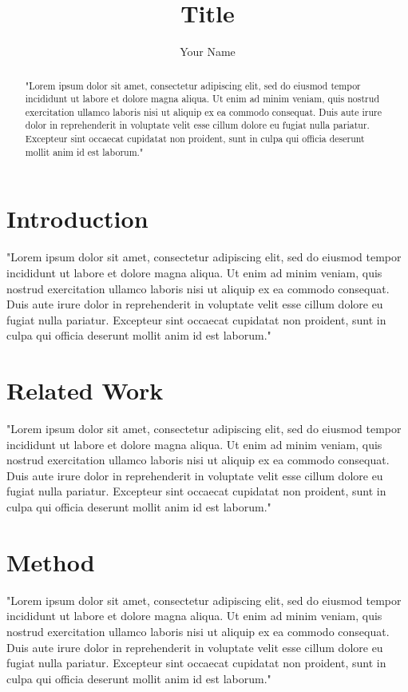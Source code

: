 \documentclass{article}
\title{Title}
\author{
  Your Name
}
\begin{document}
\maketitle


\begin{abstract}
"Lorem ipsum dolor sit amet, consectetur adipiscing elit, sed do eiusmod tempor incididunt ut labore et dolore magna aliqua. Ut enim ad minim veniam, quis nostrud exercitation ullamco laboris nisi ut aliquip ex ea commodo consequat. Duis aute irure dolor in reprehenderit in voluptate velit esse cillum dolore eu fugiat nulla pariatur. Excepteur sint occaecat cupidatat non proident, sunt in culpa qui officia deserunt mollit anim id est laborum."
\end{abstract}


\section{Introduction}
"Lorem ipsum dolor sit amet, consectetur adipiscing elit, sed do eiusmod tempor incididunt ut labore et dolore magna aliqua. Ut enim ad minim veniam, quis nostrud exercitation ullamco laboris nisi ut aliquip ex ea commodo consequat. Duis aute irure dolor in reprehenderit in voluptate velit esse cillum dolore eu fugiat nulla pariatur. Excepteur sint occaecat cupidatat non proident, sunt in culpa qui officia deserunt mollit anim id est laborum."

\section{Related Work}
"Lorem ipsum dolor sit amet, consectetur adipiscing elit, sed do eiusmod tempor incididunt ut labore et dolore magna aliqua. Ut enim ad minim veniam, quis nostrud exercitation ullamco laboris nisi ut aliquip ex ea commodo consequat. Duis aute irure dolor in reprehenderit in voluptate velit esse cillum dolore eu fugiat nulla pariatur. Excepteur sint occaecat cupidatat non proident, sunt in culpa qui officia deserunt mollit anim id est laborum."

\section{Method}
"Lorem ipsum dolor sit amet, consectetur adipiscing elit, sed do eiusmod tempor incididunt ut labore et dolore magna aliqua. Ut enim ad minim veniam, quis nostrud exercitation ullamco laboris nisi ut aliquip ex ea commodo consequat. Duis aute irure dolor in reprehenderit in voluptate velit esse cillum dolore eu fugiat nulla pariatur. Excepteur sint occaecat cupidatat non proident, sunt in culpa qui officia deserunt mollit anim id est laborum."
\end{document}
